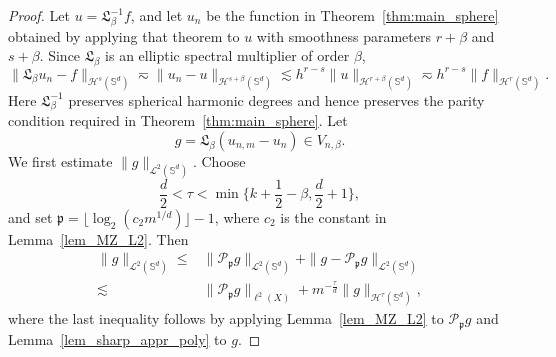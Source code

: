 \documentclass[10pt,a4paper]{amsart}
\def\SS{\mathbb{S}}
\begin{document}
\begin{proof}
Let $u=\mathfrak L_\beta^{-1}f$, and let $u_n$ be the function in Theorem~\ref{thm:main_sphere} obtained by applying that theorem to $u$ with smoothness parameters $r+\beta$ and $s+\beta$. Since $\mathfrak L_\beta$ is an elliptic spectral multiplier of order $\beta$,
\begin{equation}\label{eqn_net_appr_u}
    \|\mathfrak L_\beta u_n-f\|_{\mathcal H^s(\SS^d)}
    \eqsim\|u_n-u\|_{\mathcal H^{s+\beta}(\SS^d)}
    \lesssim h^{r-s}\|u\|_{\mathcal H^{r+\beta}(\SS^d)}
    \eqsim h^{r-s}\|f\|_{\mathcal H^r(\SS^d)}.
\end{equation}
Here $\mathfrak L_\beta^{-1}$ preserves spherical harmonic degrees and hence preserves the parity condition required in Theorem~\ref{thm:main_sphere}. Let
\begin{equation*}
    g=\mathfrak L_\beta(u_{n,m}-u_n)\in V_{n,\beta}.
\end{equation*}
We first estimate $\|g\|_{\mathcal L^2(\SS^d)}$. Choose
$$
\frac d2<\tau<\min\big\{k+\frac12-\beta,\frac{d}{2}+1\big\},
$$
and set $\mathfrak p=\lfloor\log_2(c_2m^{1/d})\rfloor-1$, where $c_2$ is the constant in Lemma~\ref{lem_MZ_L2}. Then
\begin{equation}\label{eqn_samp_step1}
    \begin{split}
        \|g\|_{\mathcal L^2(\SS^d)}
        \leq&\|\mathcal P_{\mathfrak p}g\|_{\mathcal L^2(\SS^d)}
        +\|g-\mathcal P_{\mathfrak p}g\|_{\mathcal L^2(\SS^d)}\\
        \lesssim&\|\mathcal P_{\mathfrak p}g\|_{\ell^2(X)}
        +m^{-\frac{\tau}{d}}\|g\|_{\mathcal H^\tau(\SS^d)},
    \end{split}
\end{equation}
where the last inequality follows by applying Lemma~\ref{lem_MZ_L2} to $\mathcal P_{\mathfrak p}g$ and Lemma~\ref{lem_sharp_appr_poly} to $g$.


\end{proof}
\end{document}
